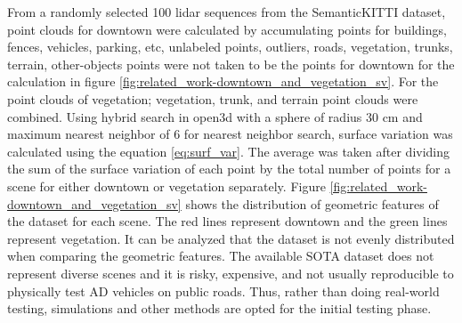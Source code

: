 From a randomly selected 100 lidar sequences from the SemanticKITTI dataset, point clouds for downtown were calculated by accumulating points for buildings, fences, vehicles, parking, etc, unlabeled points, outliers, roads, vegetation, trunks, terrain, other-objects points were not taken to be the points for downtown for the calculation in figure \ref{fig:related_work-downtown_and_vegetation_sv}. For the point clouds of vegetation; vegetation, trunk, and terrain point clouds were combined. Using hybrid search in open3d \parencite{open3d} with a sphere of radius 30 cm and maximum nearest neighbor of 6 for nearest neighbor search, surface variation was calculated using the equation \ref{eq:surf_var}. The average was taken after dividing the sum of the surface variation of each point by the total number of points for a scene for either downtown or vegetation separately. Figure \ref{fig:related_work-downtown_and_vegetation_sv} shows the distribution of geometric features of the dataset for each scene. The red lines represent downtown and the green lines represent vegetation. It can be analyzed that the dataset is not evenly distributed when comparing the geometric features. The available SOTA dataset does not represent diverse scenes and it is risky, expensive, and not usually reproducible to physically test AD vehicles on public roads. Thus, rather than doing real-world testing, simulations and other methods are opted for the initial testing phase.




